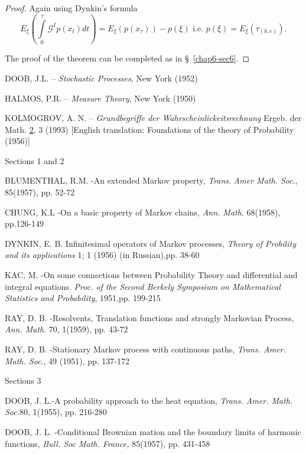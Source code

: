 \begin{proof}
Again using Dynkin's formula 
$$
E_{\xi} \left(\int\limits^{\tau}_{0} \mathscr{G}^I p(x_t)dt\right) = E_\xi
(p(x_\tau)) - p (\xi) \text{ \ i.e. \ }p(\xi) = E_\xi (\tau_{(b, c)}). 
$$

The proof of the theorem can be completed as in \S\ \ref{chap6-sec6}.
\end{proof}


\begin{thebibliography}{99}\pageoriginale

 {DOOB, J.L}. -- \textit{Stochastic Processes}, New York (1952)

 {HALMOS, P.R.} -- \textit{Measure Theory}, New York
  (1950)

 {KOLMOGROV, A. N.} -- \textit{Grundbegriffe der
  Wahrscheinlickeitsrechnung} Ergeb. der Math. \underline{2}, 3 (1993)
  [English translation: Foundations of the theory of Probability
    (1956)] 

Sections 1 and 2

 {BLUMENTHAL, R.M.} -An extended Markov property,
  \textit{Trans}. \textit{Amer Math. Soc}., 85(1957), pp. 52-72 

 {CHUNG, K.L} -On a basic property of Markov chains,
  \textit{Ann. Math}. 68(1958), pp.126-149 

 {DYNKIN}, E. B. Infinitesimal operators of Markov
  processes, \textit{Theory of Probility and its applications } 1; 1
  (1956) (in Russian),pp. 38-60 

 {KAC, M.} -On some connections between Probability Theory
  and differential and integral equations. \textit{Proc. of the Second
    Berkely Symposium on Mathematical Statistics and Probability},
  1951,pp. 199-215 

 {RAY, D. B.} -Resolvents, Translation functions and
  strongly Markovian Process, \textit{Ann. Math}. 70, 1(1959),
  pp. 43-72 

 {RAY, D. B.} -Stationary Markov process with continuous
  paths, \textit{Trans. Amer. Math. Soc}., 49 (1951), pp. 137-172 

Sections 3

 {DOOB, J. L.}\pageoriginale -A probability approach to
  the heat equation, \textit{Trans. Amer. Math. Soc.}80, 1(1955), pp. 216-280 

 {DOOB, J. L.} -Conditional Brownian mation and the
  boundary limits of harmonic functions, \textit{Bull. Soc
    Math. France,} 85(1957), pp. 431-458 


\end{thebibliography}
